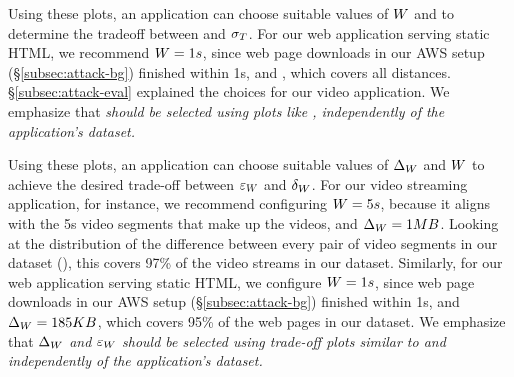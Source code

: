 Using these plots, an application can choose suitable values of $W$ and
\update{$\qsens$} to determine the tradeoff between \update{$\varepsilon$} and
$\sigma_{T}$.
For our web application serving static HTML, we recommend $W =
1s$, since web page downloads in our AWS setup (\S\ref{subsec:attack-bg})
finished within 1s, and , which covers all distances.
\S\ref{subsec:attack-eval} explained the choices for our video application.
We emphasize that {\em {} should be selected
using plots like ,
independently of the application's dataset.}

Using these plots, an application can choose suitable values of
$\Delta_{W}$ and $W$ to achieve the desired trade-off between
$\varepsilon_{W}$ and $\delta_{W}$.
For our video streaming application, for instance, we recommend configuring
$W = 5s$, because it aligns with the 5s video segments that make up the
videos, and $\Delta_{W} = 1 MB$.
Looking at the distribution of the difference between every pair of video
segments in our dataset (), this covers 97\% of
the video streams in our dataset.
Similarly, for our web application serving static HTML, we configure $W =
1s$, since web page downloads in our AWS setup (\S\ref{subsec:attack-bg})
finished within 1s, and $\Delta_{W} = 185 KB$, which covers 95\% of the web pages in
our dataset.
We emphasize that {\em $\Delta_{W}$ and $\varepsilon_W$ should be selected
using trade-off plots similar to  and
independently of the application's dataset.}
\fi

